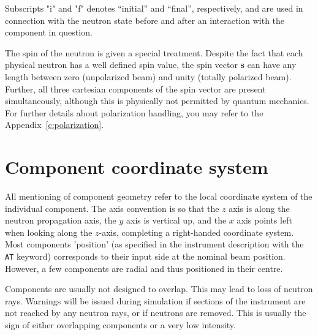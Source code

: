 Subscripts "i" and "f" denotes ``initial'' and ``final'', respectively,
and are used in connection with the neutron state before and after
an interaction with the component in question.

The spin of the neutron is given a special treatment. Despite
the fact that each physical neutron has a well defined spin value,
the \MCS spin vector
\textbf{s} can have any length between zero (unpolarized beam) and unity
(totally polarized beam). Further, all three cartesian components of
the spin vector are present simultaneously, although this is physically
not permitted by quantum mechanics.
For further details about polarization handling, you may refer to the Appendix~\ref{c:polarization}.

\section{Component coordinate system}
All mentioning of component geometry refer to
the local coordinate system of the individual component.
The axis convention is so that the $z$ axis is along
the neutron propagation axis, the $y$ axis is vertical up,
and the $x$ axis points left when looking along the $z$-axis,
completing a right-handed coordinate system.
Most components 'position' (as specified in the instrument description
with the \verb+AT+ keyword) corresponds to their input side at the nominal
beam position.
However, a few components are radial and thus positioned in their centre.

Components are usually not designed to overlap.
This may lead to loss of neutron rays.
Warnings will be issued during simulation if sections of the instrument
are not reached by any neutron rays, or if neutrons are removed.
This is usually the sign of either overlapping components
or a very low intensity.

